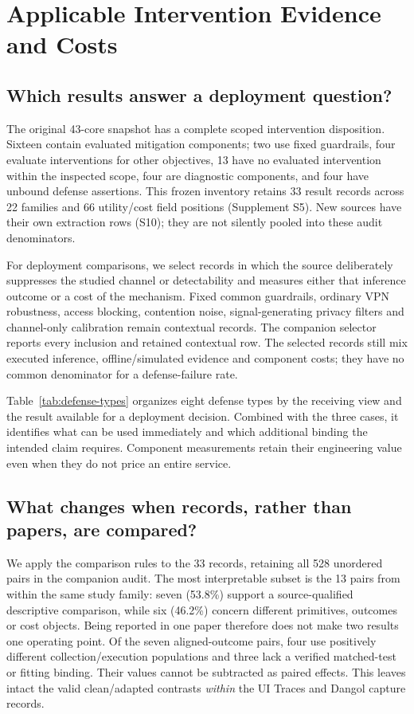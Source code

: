 \section{Applicable Intervention Evidence and Costs}\label{sec:defenses}
\subsection{Which results answer a deployment question?}
The original 43-core snapshot has a complete scoped intervention disposition. Sixteen contain evaluated mitigation components; two use fixed guardrails, four evaluate interventions for other objectives, 13 have no evaluated intervention within the inspected scope, four are diagnostic components, and four have unbound defense assertions. This frozen inventory retains 33 result records across 22 families and 66 utility/cost field positions (Supplement S5). New sources have their own extraction rows (S10); they are not silently pooled into these audit denominators.

For deployment comparisons, we select records in which the source deliberately suppresses the studied channel or detectability and measures either that inference outcome or a cost of the mechanism. Fixed common guardrails, ordinary VPN robustness, access blocking, contention noise, signal-generating privacy filters and channel-only calibration remain contextual records. The companion selector reports every inclusion and retained contextual row. The selected records still mix executed inference, offline/simulated evidence and component costs; they have no common denominator for a defense-failure rate.

Table~\ref{tab:defense-types} organizes eight defense types by the receiving view and the result available for a deployment decision. Combined with the three cases, it identifies what can be used immediately and which additional binding the intended claim requires. Component measurements retain their engineering value even when they do not price an entire service.


\subsection{What changes when records, rather than papers, are compared?}
We apply the comparison rules to the 33 records, retaining all 528 unordered pairs in the companion audit. The most interpretable subset is the 13 pairs from within the same study family: seven (53.8\%) support a source-qualified descriptive comparison, while six (46.2\%) concern different primitives, outcomes or cost objects. Being reported in one paper therefore does not make two results one operating point. Of the seven aligned-outcome pairs, four use positively different collection/execution populations and three lack a verified matched-test or fitting binding. Their values cannot be subtracted as paired effects. This leaves intact the valid clean/adapted contrasts \emph{within} the UI Traces and Dangol capture records.

